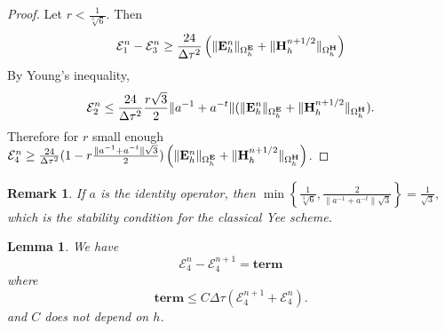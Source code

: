 \documentclass[12pt,reqno]{amsart}
\newcommand{\e}{{\bf E}}
\newcommand{\h}{{\bf H}}
\newtheorem{lem}[theorem]{Lemma}
\newtheorem{remark}[theorem]{Remark}
\theoremstyle{definition}
\numberwithin{equation}{section}
\def\Gwh{\Omega_h}
\begin{document}
\begin{proof}
Let $r<\frac{1}{\sqrt[3]{6}}$.
Then $$\mathcal{E}_1^n-\mathcal{E}_3^n\geq
\frac{24}{\Delta \tau^2}\left ( \|\e_h^n\|_{\Gwh^\e}+\|\h_h^{n+1/2}\|_{\Gwh^\h}\right)$$
By Young's inequality,
$$
\mathcal{E}_2^n\leq \frac{24}{\Delta \tau^2}\frac{r\sqrt{3}}{2}\|a^{-1}+a^{-t}\|(\|\e_h^n\|_{\Gwh^\e}+\|\h_h^{n+1/2}\|_{\Gwh^\h}).
$$
Therefore for $r$ small enough
 $\mathcal{E}_4^n\geq\frac{24}{\Delta \tau^2} (1-r\frac{\|a^{-1}+a^{-t}\|\sqrt{3}}{2})\left ( \|\e_h^n\|_{\Gwh^\e}+\|\h_h^{n+1/2}\|_{\Gwh^\h}\right)$.
\end{proof}
\begin{remark}
	If $a$ is the identity operator, then 
	$\min \left \{  \frac{1}{\sqrt[3]{6}},\frac{2}{\|a^{-1}+a^{-t}\|\sqrt{3}}  \right \}=
	\frac{1}{\sqrt{3}},
	$
	which is the stability condition for the classical Yee scheme.
\end{remark}
\begin{lem}\label{lem:sec} 
	We have
	$$\mathcal{E}_4^n-
\mathcal{E}_4^{n+1}=
\mathbf{term}
$$
where 
$$
\mathbf{term}\leq C \Delta \tau(\mathcal{E}_4^{n+1}+\mathcal{E}_4^{n}).
$$
and $C$ does not depend on $h$.
\end{lem}
\end{document}
